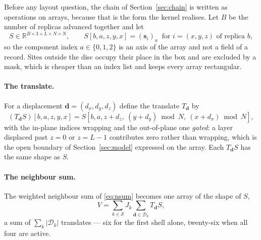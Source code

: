 \documentclass[11pt,a4paper]{article}
\newcommand{\vs}{\mathbf{s}}
\newcommand{\vd}{\mathbf{d}}
\newcommand{\shells}{\mathcal{S}}
\begin{document}
Before any layout question, the chain of Section~\ref{sec:chain} is written as
operations on arrays, because that is the form the kernel realises. Let $B$ be
the number of replicas advanced together and let
%
\begin{equation}
S \in \mathbb{R}^{B \times 3 \times L \times N \times N},
\qquad
S[b, a, z, y, x] = (\vs_i)_a \ \text{ for } i = (x,y,z) \text{ of replica } b,
\label{eq:config-array}
\end{equation}
%
so the component index $a \in \{0,1,2\}$ is an axis of the array and not a
field of a record. Sites outside the disc occupy their place in the box and are
excluded by a mask, which is cheaper than an index list and keeps every array
rectangular.

\paragraph{The translate.} For a displacement $\vd = (d_x,d_y,d_z)$ define the
translate $T_{\vd}$ by
%
\begin{equation}
(T_{\vd} S)[b,a,z,y,x]
  = S[b, a, z + d_z, \ (y + d_y) \bmod N, \ (x + d_x) \bmod N],
\label{eq:translate}
\end{equation}
%
with the in-plane indices wrapping and the out-of-plane one \emph{gated}: a
layer displaced past $z = 0$ or $z = L-1$ contributes zero rather than wrapping,
which is the open boundary of Section~\ref{sec:model} expressed on the array.
Each $T_{\vd} S$ has the same shape as $S$.

\paragraph{The neighbour sum.} The weighted neighbour sum of \eqref{eq:nsum}
becomes one array of the shape of $S$,
%
\begin{equation}
V = \sum_{k \in \shells} J_k \sum_{\vd \in \mathcal{D}_k} T_{\vd} S ,
\label{eq:V-array}
\end{equation}
%
a sum of $\sum_k |\mathcal{D}_k|$ translates --- six for the first shell alone,
twenty-six when all four are active.
\end{document}
